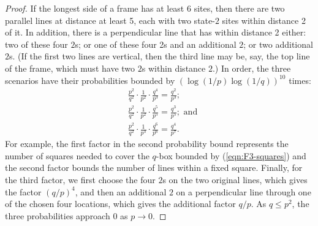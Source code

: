 \documentclass{article}
\newcommand{\cO}{\mathcal O}
\numberwithin{equation}{section}
\begin{document}
\begin{proof}



    If the longest side of a frame has at least 6 sites, then there are two parallel lines at distance at least 5, each with two state-$2$ sites within distance 2 of it. In addition, there is a perpendicular line that has within distance 2 either: 
    two of these four $2$s;
    or one of these four 2s and an additional $2$; or two additional $2$s. (If the first two lines are vertical, then the third line may be, say, the top line of the frame, which must have two $2$s within distance $2$.) In order, the three scenarios have their probabilities bounded by $(\log(1/p)\log(1/q))^{10}$ times: 
    \begin{equation*}
        \begin{aligned}
         &\frac{p^2}{q^2} \cdot \frac{1}{p^2} \cdot  \frac{q^4}{p^3}=
    \frac{q^2}{p^3};\\
    &
    \frac{p^2}{q^2} \cdot \frac{1}{p^2} \cdot  \frac{q^5}{p^5}=
    \frac{q^3}{p^5}; \text{ and}
    \\&
    \frac{p^2}{q^2} \cdot \frac{1}{p^3} \cdot  \frac{q^6}{p^6}=
    \frac{q^4}{p^7}.   
        \end{aligned}
    \end{equation*}
   For example, the first factor in the second probability bound 
   represents the number of squares needed to cover the $q$-box bounded by (\ref{eqn:F3-squares}) and the second factor bounds the number of lines within a fixed square. Finally, for the third factor, we first choose the four $2$s on the two original lines, which gives the factor $(q/p)^4$, and then an additional $2$ on a perpendicular line through one of the chosen four locations, which gives the additional factor $q/p$. 
    As $q\le p^2$, the three probabilities approach $0$ as $p\to 0$.   
\end{proof}
\end{document}
